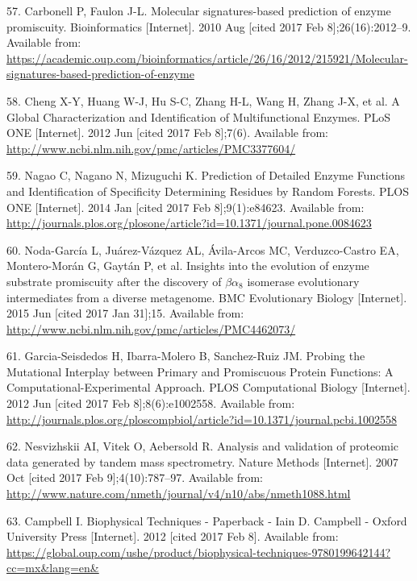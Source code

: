 \documentclass[12pt,twoside]{reedthesis}
\begin{document}
  \hypertarget{ref-carbonell_molecular_2010}{}
  57. Carbonell P, Faulon J-L. Molecular signatures-based prediction of
  enzyme promiscuity. Bioinformatics {[}Internet{]}. 2010 Aug {[}cited
  2017 Feb 8{]};26(16):2012--9. Available from:
  \url{https://academic.oup.com/bioinformatics/article/26/16/2012/215921/Molecular-signatures-based-prediction-of-enzyme}
  
  \hypertarget{ref-cheng_global_2012}{}
  58. Cheng X-Y, Huang W-J, Hu S-C, Zhang H-L, Wang H, Zhang J-X, et al. A
  Global Characterization and Identification of Multifunctional Enzymes.
  PLoS ONE {[}Internet{]}. 2012 Jun {[}cited 2017 Feb 8{]};7(6). Available
  from: \url{http://www.ncbi.nlm.nih.gov/pmc/articles/PMC3377604/}
  
  \hypertarget{ref-nagao_prediction_2014}{}
  59. Nagao C, Nagano N, Mizuguchi K. Prediction of Detailed Enzyme
  Functions and Identification of Specificity Determining Residues by
  Random Forests. PLOS ONE {[}Internet{]}. 2014 Jan {[}cited 2017 Feb
  8{]};9(1):e84623. Available from:
  \url{http://journals.plos.org/plosone/article?id=10.1371/journal.pone.0084623}
  
  \hypertarget{ref-noda-garcia_insights_2015}{}
  60. Noda-García L, Juárez-Vázquez AL, Ávila-Arcos MC, Verduzco-Castro
  EA, Montero-Morán G, Gaytán P, et al. Insights into the evolution of
  enzyme substrate promiscuity after the discovery of \(\beta\alpha_8\)
  isomerase evolutionary intermediates from a diverse metagenome. BMC
  Evolutionary Biology {[}Internet{]}. 2015 Jun {[}cited 2017 Jan
  31{]};15. Available from:
  \url{http://www.ncbi.nlm.nih.gov/pmc/articles/PMC4462073/}
  
  \hypertarget{ref-garcia-seisdedos_probing_2012}{}
  61. Garcia-Seisdedos H, Ibarra-Molero B, Sanchez-Ruiz JM. Probing the
  Mutational Interplay between Primary and Promiscuous Protein Functions:
  A Computational-Experimental Approach. PLOS Computational Biology
  {[}Internet{]}. 2012 Jun {[}cited 2017 Feb 8{]};8(6):e1002558. Available
  from:
  \url{http://journals.plos.org/ploscompbiol/article?id=10.1371/journal.pcbi.1002558}
  
  \hypertarget{ref-nesvizhskii_analysis_2007}{}
  62. Nesvizhskii AI, Vitek O, Aebersold R. Analysis and validation of
  proteomic data generated by tandem mass spectrometry. Nature Methods
  {[}Internet{]}. 2007 Oct {[}cited 2017 Feb 9{]};4(10):787--97. Available
  from:
  \url{http://www.nature.com/nmeth/journal/v4/n10/abs/nmeth1088.html}
  
  \hypertarget{ref-campbell_biophysical_2012}{}
  63. Campbell I. Biophysical Techniques - Paperback - Iain D. Campbell -
  Oxford University Press {[}Internet{]}. 2012 {[}cited 2017 Feb 8{]}.
  Available from:
  \url{https://global.oup.com/ushe/product/biophysical-techniques-9780199642144?cc=mx\&lang=en\&}
  
\end{document}
